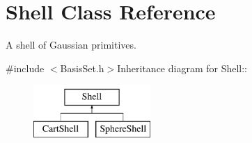 \hypertarget{classJKBuilder_1_1Shell}{
\section{Shell Class Reference}
\label{classJKBuilder_1_1Shell}
}


A shell of Gaussian primitives.  


{\ttfamily \#include $<$BasisSet.h$>$}Inheritance diagram for Shell::\begin{figure}[H]
\begin{center}
\leavevmode
\includegraphics[height=2cm]{classJKBuilder_1_1Shell}
\end{center}
\end{figure}
